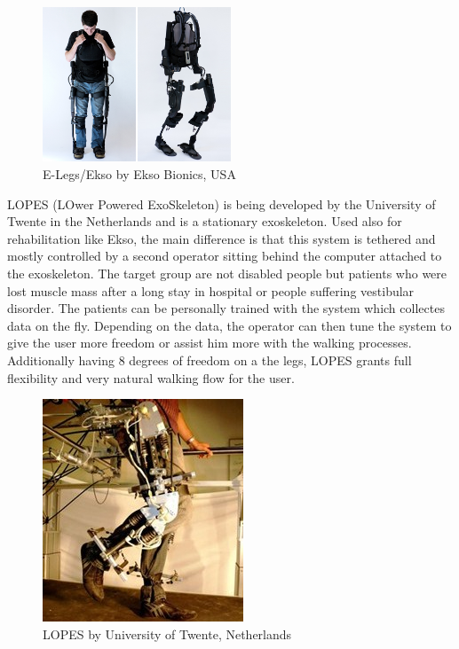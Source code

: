 \documentclass[letterpaper, 10 pt, conference]{ieeeconf}  %
\begin{document}

\begin{figure}[H]
  \centering
    \includegraphics[width=0.5\textwidth]{img/elegs}
  \caption{E-Legs/Ekso by Ekso Bionics, USA}
\end{figure}


LOPES (LOwer Powered ExoSkeleton) is being developed by the University of Twente in the Netherlands and is a stationary exoskeleton. Used also for rehabilitation like Ekso, the main difference is that this system is tethered and mostly controlled by a second operator sitting behind the computer attached to the exoskeleton. The target group are not disabled people but patients who were lost muscle mass after a long stay in hospital or people suffering vestibular disorder. The patients can be personally trained with the system which collectes data on the fly. Depending on the data, the operator can then tune the system to give the user more freedom or assist him more with the walking processes. Additionally having 8 degrees of freedom on a the legs, LOPES grants full flexibility and very natural walking flow for the user.\newpage


\begin{figure}[H]
  \centering
    \includegraphics[scale=1.1]{img/lopes}
  \caption{LOPES by University of Twente, Netherlands}
\end{figure}
\end{document}
